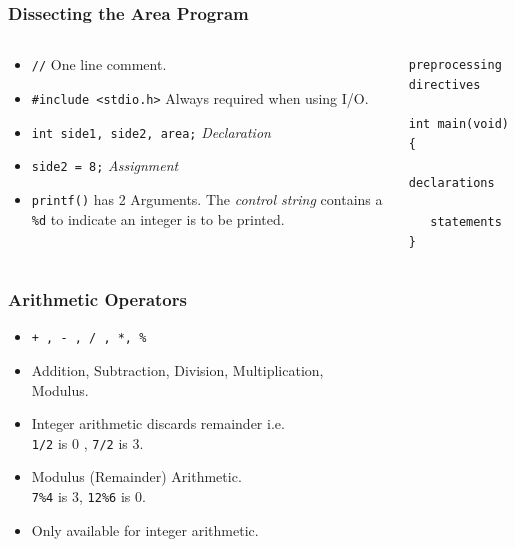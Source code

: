 \begin{frame}[fragile]
\frametitle{Dissecting the Area Program}

\begin{columns}
\begin{column}{0.40\textwidth}
\begin{itemize}[<+->]
\item \verb^//^ One line comment.
\item \verb^#include <stdio.h>^ Always required when using I/O.
\item \verb^int side1, side2, area;^ {\it Declaration}
\item \verb^side2 = 8;^ {\it  Assignment }
\item \verb^printf()^ has 2 Arguments.
The {\it control string}
contains a \verb+%d+ to indicate an integer is to be printed.
\end{itemize}
\end{column}

\begin{column}{0.55\textwidth}
\begin{lstlisting}[style=basicc]
preprocessing directives

int main(void)
{
   declarations

   statements
}
\end{lstlisting}
\end{column}

\end{columns}
\end{frame}




\begin{frame}[fragile]
\frametitle{Arithmetic Operators}

\begin{itemize}[<+->]
\item \verb^+ , - , / , *, %^
\item Addition, Subtraction, Division, Multiplication,\\ Modulus.
\item Integer arithmetic discards remainder i.e.\\
\verb+1/2+ is 0 , \verb+7/2+ is 3.
\item Modulus (Remainder) Arithmetic.\\
\verb+7%4+ is 3, \verb+12%6+ is 0.

\item
Only available for integer arithmetic.
\end{itemize}
\end{frame}



